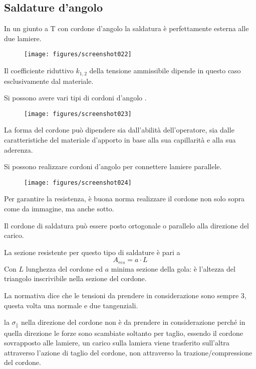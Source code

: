 \documentclass[a4paper, 15pt]{article}
\begin{document}
\subsection{Saldature d'angolo}
\begin{adjustwidth}{2in}{}
	In un giunto a T con cordone d'angolo la saldatura è perfettamente esterna alle due lamiere.
   \begin{figure}[H]
   	\centering
   	\texttt{[image: figures/screenshot022]}
   	\label{fig:screenshot022}
   \end{figure}
   Il coefficiente riduttivo $k_{1,2}$ della tensione ammissibile  dipende in questo caso esclusivamente dal materiale. \newline 
   
   Si possono avere vari tipi di cordoni d'angolo .
   \begin{figure}[H]
   	\centering
   	\texttt{[image: figures/screenshot023]}
   	\label{fig:screenshot023}
   \end{figure}
   La forma del cordone può dipendere sia dall'abilità dell'operatore, sia dalle caratteristiche del materiale d'apporto in base alla sua capillarità e alla sua aderenza. \newline 
   
   Si possono realizzare cordoni d'angolo per connettere lamiere parallele. 
   \begin{figure}[H]
   	\centering
   	\texttt{[image: figures/screenshot024]}
   	\label{fig:screenshot024}
   \end{figure}
   Per garantire la resistenza, è buona norma realizzare il cordone non solo sopra come da immagine, ma anche sotto. \newline 
   
   Il cordone di saldatura può essere posto ortogonale o parallelo alla direzione del carico.\newline 
   
   La sezione resistente per questo tipo di saldature è pari a
   \[A_{res} = a\cdot L\]
   Con $L$ lunghezza del cordone ed $a$ minima sezione della gola: è l'altezza del triangolo inscrivibile nella sezione del cordone.\newline 
   
   La normativa dice che le tensioni da prendere in considerazione sono sempre 3, questa volta una normale e due tangenziali.  
   
   la $\sigma_{\parallel}$ nella direzione del cordone non è da prendere in considerazione perché in quella direzione  le forze sono scambiate soltanto per taglio, essendo il cordone sovrapposto alle lamiere, un carico sulla lamiera viene trasferito sull'altra attraverso l'azione di taglio del cordone, non attraverso la trazione/compressione del cordone. \newline 
   

\end{adjustwidth}
\end{document}
